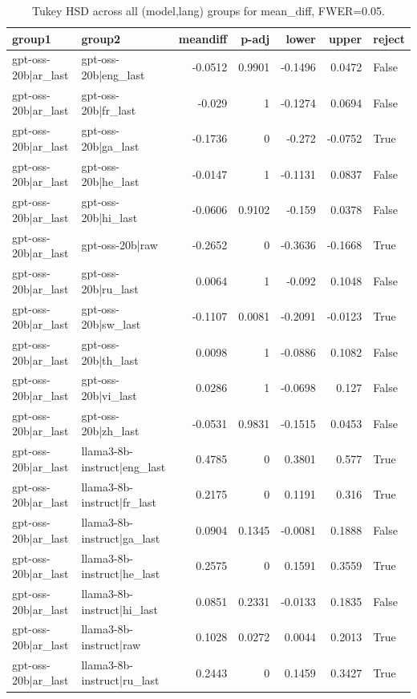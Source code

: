 \begin{table}
\caption{Tukey HSD across all (model,lang) groups for mean_diff, FWER=0.05.}
\label{tab:tukey_all_models_all_langs_mean_diff}
\begin{tabular}{l l r r r r l}
\toprule
group1 & group2 & meandiff & p-adj & lower & upper & reject \\
\midrule
gpt-oss-20b|ar_last & gpt-oss-20b|eng_last & -0.0512 & 0.9901 & -0.1496 & 0.0472 & False \\
gpt-oss-20b|ar_last & gpt-oss-20b|fr_last & -0.029 & 1 & -0.1274 & 0.0694 & False \\
gpt-oss-20b|ar_last & gpt-oss-20b|ga_last & -0.1736 & 0 & -0.272 & -0.0752 & True \\
gpt-oss-20b|ar_last & gpt-oss-20b|he_last & -0.0147 & 1 & -0.1131 & 0.0837 & False \\
gpt-oss-20b|ar_last & gpt-oss-20b|hi_last & -0.0606 & 0.9102 & -0.159 & 0.0378 & False \\
gpt-oss-20b|ar_last & gpt-oss-20b|raw & -0.2652 & 0 & -0.3636 & -0.1668 & True \\
gpt-oss-20b|ar_last & gpt-oss-20b|ru_last & 0.0064 & 1 & -0.092 & 0.1048 & False \\
gpt-oss-20b|ar_last & gpt-oss-20b|sw_last & -0.1107 & 0.0081 & -0.2091 & -0.0123 & True \\
gpt-oss-20b|ar_last & gpt-oss-20b|th_last & 0.0098 & 1 & -0.0886 & 0.1082 & False \\
gpt-oss-20b|ar_last & gpt-oss-20b|vi_last & 0.0286 & 1 & -0.0698 & 0.127 & False \\
gpt-oss-20b|ar_last & gpt-oss-20b|zh_last & -0.0531 & 0.9831 & -0.1515 & 0.0453 & False \\
gpt-oss-20b|ar_last & llama3-8b-instruct|eng_last & 0.4785 & 0 & 0.3801 & 0.577 & True \\
gpt-oss-20b|ar_last & llama3-8b-instruct|fr_last & 0.2175 & 0 & 0.1191 & 0.316 & True \\
gpt-oss-20b|ar_last & llama3-8b-instruct|ga_last & 0.0904 & 0.1345 & -0.0081 & 0.1888 & False \\
gpt-oss-20b|ar_last & llama3-8b-instruct|he_last & 0.2575 & 0 & 0.1591 & 0.3559 & True \\
gpt-oss-20b|ar_last & llama3-8b-instruct|hi_last & 0.0851 & 0.2331 & -0.0133 & 0.1835 & False \\
gpt-oss-20b|ar_last & llama3-8b-instruct|raw & 0.1028 & 0.0272 & 0.0044 & 0.2013 & True \\
gpt-oss-20b|ar_last & llama3-8b-instruct|ru_last & 0.2443 & 0 & 0.1459 & 0.3427 & True \\

\end{tabular}
\end{table}
